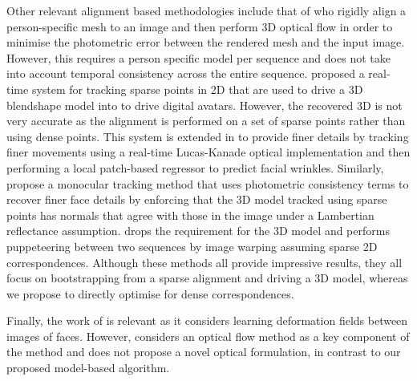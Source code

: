 Other relevant alignment based methodologies include that of
\citet{Suwajanakorn:2014bl} who rigidly align a person-specific mesh
to an image and then perform 3D optical flow in order to minimise the photometric
error between the rendered mesh and the input image. However, this requires
a person specific model per sequence and does not take into account temporal
consistency across the entire sequence. \citet{Cao:2014bi} proposed a real-time
system for tracking sparse points in 2D that are used to drive a 3D blendshape
model into to drive digital avatars. However, the recovered 3D is not
very accurate as the alignment is performed on a set of sparse points rather
than using dense points. This system is extended in
\citet{Cao:2015gy} to provide finer details by tracking finer movements using
a real-time Lucas-Kanade optical implementation and then performing a
local patch-based regressor to predict facial wrinkles.
Similarly, \citet{Garrido:2013dia} propose a monocular tracking method
that uses photometric consistency terms to recover finer face details
by enforcing that the 3D model tracked using sparse points has normals
that agree with those in the image under a Lambertian reflectance
assumption. \citet{Garrido:2014gn} drops the requirement for the 3D
model and performs puppeteering between two sequences by image warping
assuming sparse 2D correspondences. Although these methods all provide
impressive results, they all focus on bootstrapping from a sparse alignment and driving a 3D model, whereas we propose to directly optimise for dense correspondences.

Finally, the work of \citet{kemelmacher2012collection}
is relevant as it considers learning deformation fields between images of faces.
However, \citet{kemelmacher2012collection} considers an optical flow method
as a key component of the method and does not propose a novel optical
formulation, in contrast to our proposed model-based algorithm.
